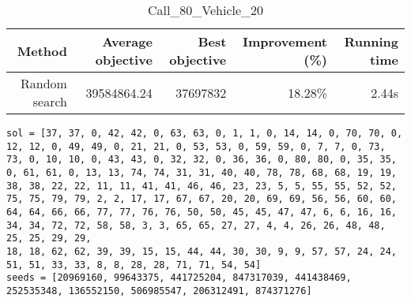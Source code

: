 \begin{table}[ht]
\centering
\caption{Call\_80\_Vehicle\_20}
\label{tab:call80vehicle20}
\begin{tabular}{|r|r|r|r|r|}
Method & Average objective & Best objective & Improvement (\%) & Running time \\
\hline
Random search & 39584864.24 & 37697832 & 18.28\% & 2.44s\\
\end{tabular}%
\end{table}
\begin{lstlisting}[label={lst:call80vehicle20},caption=Optimal solution call\_80\_vehicle\_20]
sol = [37, 37, 0, 42, 42, 0, 63, 63, 0, 1, 1, 0, 14, 14, 0, 70, 70, 0, 12, 12, 0, 49, 49, 0, 21, 21, 0, 53, 53, 0, 59, 59, 0, 7, 7, 0, 73, 73, 0, 10, 10, 0, 43, 43, 0, 32, 32, 0, 36, 36, 0, 80, 80, 0, 35, 35, 0, 61, 61, 0, 13, 13, 74, 74, 31, 31, 40, 40, 78, 78, 68, 68, 19, 19, 38, 38, 22, 22, 11, 11, 41, 41, 46, 46, 23, 23, 5, 5, 55, 55, 52, 52, 75, 75, 79, 79, 2, 2, 17, 17, 67, 67, 20, 20, 69, 69, 56, 56, 60, 60, 64, 64, 66, 66, 77, 77, 76, 76, 50, 50, 45, 45, 47, 47, 6, 6, 16, 16, 34, 34, 72, 72, 58, 58, 3, 3, 65, 65, 27, 27, 4, 4, 26, 26, 48, 48, 25, 25, 29, 29,
18, 18, 62, 62, 39, 39, 15, 15, 44, 44, 30, 30, 9, 9, 57, 57, 24, 24, 51, 51, 33, 33, 8, 8, 28, 28, 71, 71, 54, 54]
seeds = [20969160, 99643375, 441725204, 847317039, 441438469, 252535348, 136552150, 506985547, 206312491, 874371276]
\end{lstlisting}%
\clearpage


